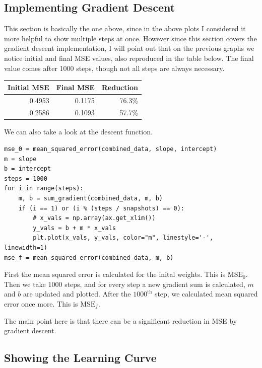\documentclass[letterpaper]{article}
\begin{document}
\subsection{Implementing Gradient Descent}

This section is basically the one above, since in the above plots I considered
it more helpful to show multiple steps at once. However since this section
covers the gradient descent implementation, I will point out that on the
previous graphs we notice initial and final MSE values, also reproduced
in the table below. The final value comes after 1000 steps, though not all
steps are always necessary.
\begin{center}
\begin{tabular}{|r|r|r|}
\hline
Initial MSE & Final MSE & Reduction\\
\hline\hline
0.4953 & 0.1175 & 76.3\%\\
\hline
0.2586 & 0.1093 & 57.7\%\\
\hline
\end{tabular}
\end{center}

We can also take a look at the descent function.
\begin{verbatim}
mse_0 = mean_squared_error(combined_data, slope, intercept)
m = slope
b = intercept
steps = 1000
for i in range(steps):
    m, b = sum_gradient(combined_data, m, b)
    if (i == 1) or (i % (steps / snapshots) == 0):
        # x_vals = np.array(ax.get_xlim())
        y_vals = b + m * x_vals
        plt.plot(x_vals, y_vals, color="m", linestyle='-', linewidth=1)
mse_f = mean_squared_error(combined_data, m, b)
\end{verbatim}
First the mean squared error is calculated for the inital weights. This is
$\text{MSE}_0$. Then we take $1000$ steps, and for every step a new gradient sum is
calculated, $m$ and $b$ are updated and plotted. After the $1000^{\text{th}}$
step, we calculated mean squared error once more. This is $\text{MSE}_f$.

The main point here is that there can be a significant reduction in MSE by
gradient descent.

\subsection{Showing the Learning Curve}
\end{document}
